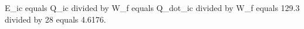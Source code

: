E_ic equals Q_ic divided by W_f equals Q_dot_ic divided by W_f equals 129.3 divided by 28 equals 4.6176.